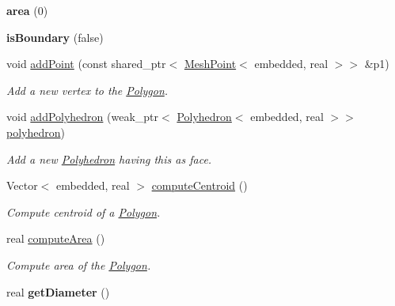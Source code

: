 \begin{DoxyCompactItemize}
\item 
\hypertarget{class_polygon_a5288995359998f39cd317212e7346510}{{\bfseries area} (0)}\label{class_polygon_a5288995359998f39cd317212e7346510}

\item 
\hypertarget{class_polygon_abcf034f39dd420a33f650510ecc3bb98}{{\bfseries is\-Boundary} (false)}\label{class_polygon_abcf034f39dd420a33f650510ecc3bb98}

\item 
\hypertarget{class_polygon_af227451b2f12b89bab30c619f3805d97}{void \hyperlink{class_polygon_af227451b2f12b89bab30c619f3805d97}{add\-Point} (const shared\-\_\-ptr$<$ \hyperlink{class_mesh_point}{\-Mesh\-Point}$<$ embedded, real $>$$>$ \&p1)}\label{class_polygon_af227451b2f12b89bab30c619f3805d97}

\begin{DoxyCompactList}\small\item\em \-Add a new vertex to the \hyperlink{class_polygon}{\-Polygon}. \end{DoxyCompactList}\item 
\hypertarget{class_polygon_a663e3901b49a938202abc2ac89d963df}{void \hyperlink{class_polygon_a663e3901b49a938202abc2ac89d963df}{add\-Polyhedron} (weak\-\_\-ptr$<$ \hyperlink{class_polyhedron}{\-Polyhedron}$<$ embedded, real $>$$>$ \hyperlink{class_polygon_a57bfc8000b2c43678fcc5841252f744d}{polyhedron})}\label{class_polygon_a663e3901b49a938202abc2ac89d963df}

\begin{DoxyCompactList}\small\item\em \-Add a new \hyperlink{class_polyhedron}{\-Polyhedron} having this as face. \end{DoxyCompactList}\item 
\-Vector$<$ embedded, real $>$ \hyperlink{class_polygon_a53555fe6109d8ddf75d432f157f021c7}{compute\-Centroid} ()
\begin{DoxyCompactList}\small\item\em \-Compute centroid of a \hyperlink{class_polygon}{\-Polygon}. \end{DoxyCompactList}\item 
real \hyperlink{class_polygon_af53fc15da94e704d6aab016171f6c15f}{compute\-Area} ()
\begin{DoxyCompactList}\small\item\em \-Compute area of the \hyperlink{class_polygon}{\-Polygon}. \end{DoxyCompactList}\item 
\hypertarget{class_polygon_a3b375cd2abd0f7535041b17d7d7b4f14}{real {\bfseries get\-Diameter} ()}\label{class_polygon_a3b375cd2abd0f7535041b17d7d7b4f14}


\end{DoxyCompactItemize}

